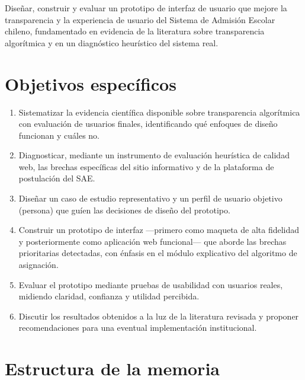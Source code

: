 Diseñar, construir y evaluar un prototipo de interfaz de usuario que mejore la transparencia y la experiencia de usuario del Sistema de Admisión Escolar chileno, fundamentado en evidencia de la literatura sobre transparencia algorítmica y en un diagnóstico heurístico del sistema real.

\section*{Objetivos específicos}

\begin{enumerate}
    \item Sistematizar la evidencia científica disponible sobre transparencia algorítmica con evaluación de usuarios finales, identificando qué enfoques de diseño funcionan y cuáles no.
    \item Diagnosticar, mediante un instrumento de evaluación heurística de calidad web, las brechas específicas del sitio informativo y de la plataforma de postulación del SAE.
    \item Diseñar un caso de estudio representativo y un perfil de usuario objetivo (persona) que guíen las decisiones de diseño del prototipo.
    \item Construir un prototipo de interfaz —primero como maqueta de alta fidelidad y posteriormente como aplicación web funcional— que aborde las brechas prioritarias detectadas, con énfasis en el módulo explicativo del algoritmo de asignación.
    \item Evaluar el prototipo mediante pruebas de usabilidad con usuarios reales, midiendo claridad, confianza y utilidad percibida.
    \item Discutir los resultados obtenidos a la luz de la literatura revisada y proponer recomendaciones para una eventual implementación institucional.
\end{enumerate}

\section*{Estructura de la memoria}

